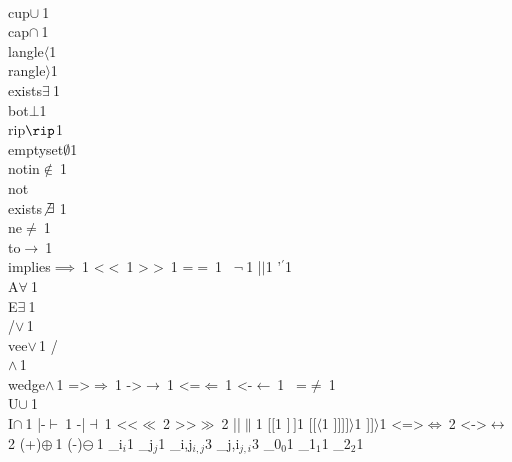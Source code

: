 {        {\\cup}{{$\cup\ $}}1
        {\\cap}{{$\cap\ $}}1
        {\\langle}{{$\langle$}}1
        {\\rangle}{{$\rangle$}}1
        {\\exists}{{$\exists\ $}}1
        {\\bot}{{$\bot$}}1
        {\\rip}{{$\rip$}}1
        {\\emptyset}{{$\emptyset$}}1
        {\\notin}{{$\notin\ $}}1
        {\\not\\exists}{{$\not\exists\ $}}1
        {\\ne}{{$\ne\ $}}1
        {\\to}{{$\to\ $}}1
        {\\implies}{{$\implies\ $}}1
        {<}{{$<\ $}}1
        {>}{{$>\ $}}1
        {=}{{$=\ $}}1
        {~}{{$\neg\ $}}1
        {|}{{$\mid$}}1
        {'}{{$^\prime$}}1
        {\\A}{{$\forall\ $}}1
        {\\E}{{$\exists\ $}}1
        {\\/}{{$\vee\,$}}1
        {\\vee}{{$\vee\,$}}1
        {/\\}{{$\wedge\,$}}1
        {\\wedge}{{$\wedge\,$}}1
        {=>}{{$\Rightarrow\ $}}1
        {->}{{$\rightarrow\ $}}1
        {<=}{{$\Leftarrow\ $}}1
        {<-}{{$\leftarrow\ $}}1
        {~=}{{$\neq\ $}}1
        {\\U}{{$\cup\ $}}1
        {\\I}{{$\cap\ $}}1
        {|-}{{$\vdash\ $}}1
        {-|}{{$\dashv\ $}}1
        {<<}{{$\ll\ $}}2
        {>>}{{$\gg\ $}}2
        {||}{{$\|$}}1
        {[}{{$[$}}1
        {]}{{$\,]$}}1
        {[[}{{$\langle$}}1
        {]]]}{{$]\rangle$}}1
        {]]}{{$\rangle$}}1
        {<=>}{{$\Leftrightarrow\ $}}2
        {<->}{{$\leftrightarrow\ $}}2
        {(+)}{{$\oplus\ $}}1
        {(-)}{{$\ominus\ $}}1
        {_i}{{$_{i}$}}1
        {_j}{{$_{j}$}}1
        {_{i,j}}{{$_{i,j}$}}3
        {_{j,i}}{{$_{j,i}$}}3
        {_0}{{$_0$}}1
        {_1}{{$_1$}}1
        {_2}{{$_2$}}1
}
